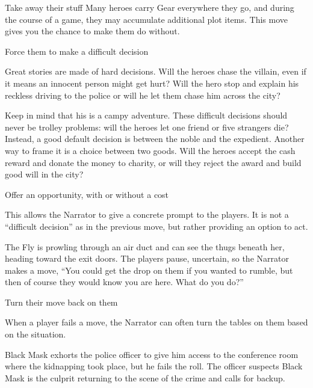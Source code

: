 \begin{narratormove}{Take away their stuff}
{
  Many heroes carry Gear everywhere they go, and during the course of
  a game, they may accumulate additional plot items.
  This move gives you the chance to make them do without.
}
\end{narratormove}

\begin{narratormove}{Force them to make a difficult decision}
{
  Great stories are made of hard decisions.
  Will the heroes chase the villain, even if it means an innocent
  person might get hurt? Will the hero stop and explain his reckless
  driving to the police or will he let them chase him across the city?

  Keep in mind that his is a campy adventure. These difficult
  decisions should never be trolley problems: will the heroes let one
  friend or five strangers die? Instead, a good default decision
  is between the noble and the expedient. Another way to frame it
  is a choice between two goods. Will the heroes accept the cash
  reward and donate the money to charity, or will they reject the
  award and build good will in the city?
}
\end{narratormove}

\begin{narratormove}{Offer an opportunity, with or without a cost}
{  
  This allows the Narrator to give a concrete prompt to the players.
  It is not a ``difficult decision'' as in the previous move,
  but rather providing an option to act.

  \begin{example}
    The Fly is prowling through an air duct and can see the
    thugs beneath her, heading toward the exit doors.
    The players pause, uncertain, so the Narrator
    makes a move, ``You could get the drop on them if you wanted
    to rumble, but then of course they would know you are here.
    What do you do?''
  \end{example}
}
\end{narratormove}

\begin{narratormove}{Turn their move back on them}
{
  When a player fails a move, the Narrator can often turn the tables
  on them based on the situation.

  \begin{example}
    Black Mask exhorts the police officer to give him access
    to the conference room where the kidnapping took place,
    but he fails the roll. The officer suspects Black Mask
    is the culprit returning to the scene of the crime
    and calls for backup.
  \end{example}
}
\end{narratormove}

